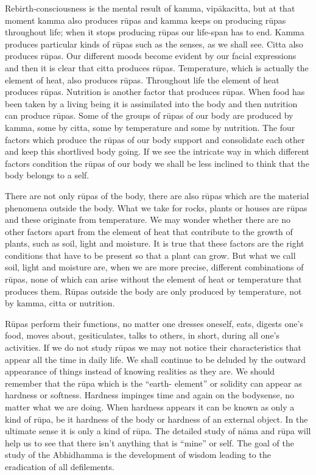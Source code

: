 \documentclass{book}
\begin{document}
Rebirth-consciousness is the mental result of kamma, vip\-\=akacitta,
but at that moment kamma also produces r\=upas and kamma keeps on
producing r\=upas throughout life; when it stops producing r\=upas our
life-span has to end. Kamma produces particular kinds of r\=upas such
as the senses, as we shall see. Citta also produces r\=upas. Our
different moods become evident by our facial expressions and then it is
clear that citta produces r\=upas. Temperature, which is actually the
element of heat, also produces r\=upas. Throughout life the element
of heat produces r\=upas. Nutrition is another factor that produces
r\=upas. When food has been taken by a living being it is assimilated
into the body and then nutrition can produce r\=upas. Some of the
groups of r\=upas of our body are produced by kamma, some by citta,
some by temperature and some by nutrition. The four factors which
produce the r\=upas of our body support and consolidate each other and
keep this shortlived body going. If we see the intricate way in which
different factors condition the r\=upas of our body we shall be less
inclined to think that the body belongs to a self.

There are not only r\=upas of the body, there are also r\=upas which are
the material phenomena outside the body. What we take for rocks, plants
or houses are r\=upas and these originate from temperature. We may
wonder whether there are no other factors apart from the element of
heat that contribute to the growth of plants, such as soil, light and
moisture. It is true that these factors are the right conditions that
have to be present so that a plant can grow. But what we call soil,
light and moisture are, when we are more precise, different
combinations of r\=upas, none of which can arise without the element of
heat or temperature that produces them. R\=upas outside the body are
only produced by temperature, not by kamma, citta or nutrition.

R\=upas perform their functions, no matter one dresses oneself, eats,
digests one's food, moves about, gesiticulates, talks to others, in
short, during all one's activities. If we do not study r\=upas we may
not notice their characteristics that appear all the time in daily
life. We shall continue to be deluded by the outward appearance of
things instead of knowing realities as they are. We should remember
that the r\=upa which is the ``earth- element'' or solidity can
appear as hardness or softness. Hardness impinges time and again on the
bodysense, no matter what we are doing. When hardness appears it can be
known as only a kind of r\=upa, be it hardness of the body or hardness
of an external object. In the ultimate sense it is only a kind of
r\=upa. The detailed study of n{\=a}ma and r\=upa will help us to see
that there isn't anything that is ``mine'' or self. The goal of the
study of the Abhidhamma is the development of wisdom leading to the
eradication of all defilements.
\end{document}
